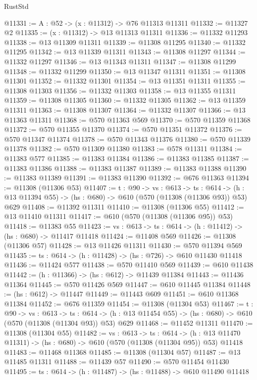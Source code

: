 \begin{lexlean}{RustStd}
\begin{coremodule}
@11331 := {A : @52} -> (x : @11312) -> @76 @11313 @11311
@11332 := @11327 @2
@11335 := (x : @11312) -> @13 @11313 @11311
@11336 := @11332 @11293
@11338 := @13 @11309 @11311
@11339 := @11308 @11295
@11340 := @11332 @11295
@11342 := @13 @11339 @11311
@11343 := @11308 @11297
@11344 := @11332 @11297
@11346 := @13 @11343 @11311
@11347 := @11308 @11299
@11348 := @11332 @11299
@11350 := @13 @11347 @11311
@11351 := @11308 @11301
@11352 := @11332 @11301
@11354 := @13 @11351 @11311
@11355 := @11308 @11303
@11356 := @11332 @11303
@11358 := @13 @11355 @11311
@11359 := @11308 @11305
@11360 := @11332 @11305
@11362 := @13 @11359 @11311
@11363 := @11308 @11307
@11364 := @11332 @11307
@11366 := @13 @11363 @11311
@11368 := @570 @11363 @569
@11370 := @570 @11359 @11368
@11372 := @570 @11355 @11370
@11374 := @570 @11351 @11372
@11376 := @570 @11347 @11374
@11378 := @570 @11343 @11376
@11380 := @570 @11339 @11378
@11382 := @570 @11309 @11380
@11383 := @578 @11311
@11384 := @11383 @577
@11385 := @11383 @11384
@11386 := @11383 @11385
@11387 := @11383 @11386
@11388 := @11383 @11387
@11389 := @11383 @11388
@11390 := @11383 @11389
@11391 := @11383 @11390
@11392 := @676 @11363
@11394 := @11308 (@11306 @53)
@11407 := {t : @90} ->
  {vs : @613} ->
  {ts : @614} -> (h : @13 @11394 @55) -> (hs : @680) -> @610 (@570 (@11308 (@11306 @93)) @53) @629
@11408 := @11392 @11311
@11410 := @11308 (@11306 @55)
@11412 := @13 @11410 @11311
@11417 := @610 (@570 (@11308 (@11306 @95)) @53)
@11418 := @11383 @55
@11423 := {vs : @613} -> {ts : @614} -> (h : @11412) -> (hs : @680) -> @11417 @11418
@11424 := @11408 @569
@11426 := @11308 (@11306 @57)
@11428 := @13 @11426 @11311
@11430 := @570 @11394 @569
@11435 := {ts : @614} -> (h : @11428) -> (hs : @726) -> @610 @11430 @11418
@11436 := @11424 @577
@11438 := @570 @11410 @569
@11439 := @610 @11438
@11442 := (h : @11366) -> (hs : @612) -> @11439 @11384
@11443 := @11436 @11364
@11445 := @570 @11426 @569
@11447 := @610 @11445 @11384
@11448 := (hs : @612) -> @11447
@11449 := @11443 @609
@11451 := @610 @11368 @11384
@11452 := @676 @11359
@11454 := @11308 (@11304 @53)
@11467 := {t : @90} ->
  {vs : @613} ->
  {ts : @614} -> (h : @13 @11454 @55) -> (hs : @680) -> @610 (@570 (@11308 (@11304 @93)) @53) @629
@11468 := @11452 @11311
@11470 := @11308 (@11304 @55)
@11482 := {vs : @613} ->
  {ts : @614} ->
  (h : @13 @11470 @11311) -> (hs : @680) -> @610 (@570 (@11308 (@11304 @95)) @53) @11418
@11483 := @11468 @11368
@11485 := @11308 (@11304 @57)
@11487 := @13 @11485 @11311
@11488 := @11439 @57
@11490 := @570 @11454 @11430
@11495 := {ts : @614} -> (h : @11487) -> (hs : @11488) -> @610 @11490 @11418

\end{coremodule}
\end{lexlean}
